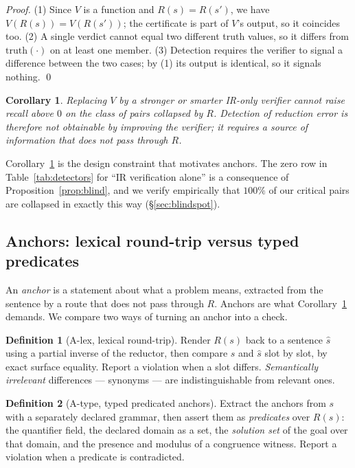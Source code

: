\documentclass[11pt]{article}
\newcommand{\Alex}{\textsf{A-lex}}
\newcommand{\Atype}{\textsf{A-type}}
\newtheorem{corollary}{Corollary}
\theoremstyle{definition}
\newtheorem{definition}{Definition}
\begin{document}
\begin{proof}
(1) Since $V$ is a function and $R(s) = R(s')$, we have $V(R(s)) = V(R(s'))$;
the certificate is part of $V$'s output, so it coincides too. (2) A single
verdict cannot equal two different truth values, so it differs from
$\mathrm{truth}(\cdot)$ on at least one member. (3) Detection requires the
verifier to signal a difference between the two cases; by (1) its output is
identical, so it signals nothing. \qed
\end{proof}

\begin{corollary}
\label{cor:stronger}
Replacing $V$ by a stronger or smarter IR-only verifier cannot raise recall above
$0$ on the class of pairs collapsed by $R$. Detection of reduction error is
therefore not obtainable by improving the verifier; it requires a source of
information that does not pass through $R$.
\end{corollary}

Corollary~\ref{cor:stronger} is the design constraint that motivates anchors. The
zero row in Table~\ref{tab:detectors} for ``IR verification alone'' is a
consequence of Proposition~\ref{prop:blind}, and we verify empirically that
$100\%$ of our critical pairs are collapsed in exactly this way
(\S\ref{sec:blindspot}).

\subsection{Anchors: lexical round-trip versus typed predicates}
\label{sec:anchors}

An \emph{anchor} is a statement about what a problem means, extracted from the
sentence by a route that does not pass through $R$. Anchors are what
Corollary~\ref{cor:stronger} demands. We compare two ways of turning an anchor
into a check.

\begin{definition}[\Alex, lexical round-trip]
\label{def:alex}
Render $R(s)$ back to a sentence $\hat{s}$ using a partial inverse of the
reductor, then compare $s$ and $\hat{s}$ slot by slot, by exact surface
equality. Report a violation when a slot differs. \emph{Semantically irrelevant}
differences --- synonyms --- are indistinguishable from relevant ones.
\end{definition}

\begin{definition}[\Atype, typed predicated anchors]
\label{def:atype}
Extract the anchors from $s$ with a separately declared grammar, then assert them
as \emph{predicates} over $R(s)$: the quantifier field, the declared domain as a
set, the \emph{solution set} of the goal over that domain, and the presence and
modulus of a congruence witness. Report a violation when a predicate is
contradicted.
\end{definition}
\end{document}
